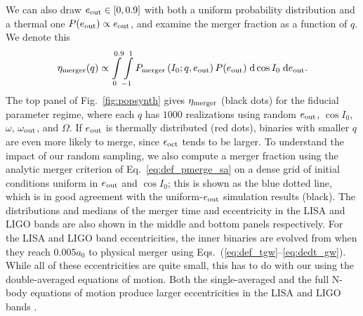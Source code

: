 \documentclass[
        fleqn,
        usenatbib,
    ]{mnras}
\newcommand*{\p}[1]{\left(#1\right)}
\begin{document}
We can also draw $e_{\rm out} \in [0, 0.9]$ with both a uniform probability
distribution and a thermal one $P(e_{\rm out}) \propto e_{\rm out}$, and examine
the merger fraction as a function of $q$. We denote this
\begin{equation}
    \eta_{\rm merger}(q) \propto
        \int\limits_{0}^{0.9}\int\limits_{-1}^1
            P_{\rm merger}\p{I_0; q, e_{\rm out}} P(e_{\rm out})
            \;\mathrm{d}\cos I_0\;\mathrm{d}e_{\rm out}.
\end{equation}
The top panel of Fig.~\ref{fig:popsynth} gives $\eta_{\rm merger}$ (black
dots) for the fiducial parameter regime, where each $q$ has $1000$ realizations
using random $e_{\rm out}$, $\cos I_0$, $\omega$, $\omega_{\rm out}$, and
$\Omega$. If $e_{\rm out}$ is thermally distributed (red dots), binaries with
smaller $q$ are even more likely to merge, since $\epsilon_{\rm oct}$ tends to
be larger. To understand the impact of our random sampling, we also compute a
merger fraction using the analytic merger criterion of
Eq.~\eqref{eq:def_pmerge_sa} on a dense grid of initial conditions uniform in
$e_{\rm out}$ and $\cos I_0$; this is shown as the blue dotted line, which is in
good agreement with the uniform-$e_{\rm out}$ simulation results (black). The
distributions and medians of the merger time and eccentricity in the LISA and
LIGO bands are also shown in the middle and bottom panels respectively. For the
LISA and LIGO band eccentricities, the inner binaries are evolved from when they
reach $0.005 a_0$ to physical merger using
Eqs.~(\ref{eq:def_tgw}--\ref{eq:dedt_gw}). While all of these eccentricities are
quite small, this has to do with our using the double-averaged equations of
motion. Both the single-averaged and the full N-body equations of motion produce
larger eccentricities in the LISA and LIGO bands \citep{LL19}.
\end{document}
